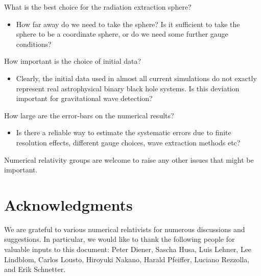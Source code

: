 \documentclass[prd,preprintnumbers,superscriptaddress,eqsecnum]{revtex4}
\numberwithin{equation}{section}
\begin{document}
What is the best choice for the radiation extraction sphere?
\begin{itemize}
\item How far away do we need to take the sphere?  Is it sufficient to
  take the sphere to be a coordinate sphere, or do we need some
  further gauge conditions?
\end{itemize}
How important is the choice of initial data?
\begin{itemize}
\item Clearly, the initial data used in almost all current simulations
  do not exactly represent real astrophysical binary black hole
  systems. Is this deviation important for gravitational wave
  detection?
\end{itemize}
How large are the error-bars on the numerical results?
\begin{itemize}
\item Is there a reliable way to estimate the systematic errors due to
  finite resolution effects, different gauge choices, wave extraction
  methods etc?  
\end{itemize}

Numerical relativity groups are welcome to raise any other issues that
might be important.


\section*{Acknowledgments}

We are grateful to various numerical relativists for numerous
discussions and suggestions. In particular, we would like to thank the
following people for valuable inputs to this document: Peter Diener,
Sascha Husa, Luis Lehner, Lee Lindblom, Carlos Lousto, Hiroyuki
Nakano, Harald Pfeiffer, Luciano Rezzolla, and Erik Schnetter.
\end{document}
